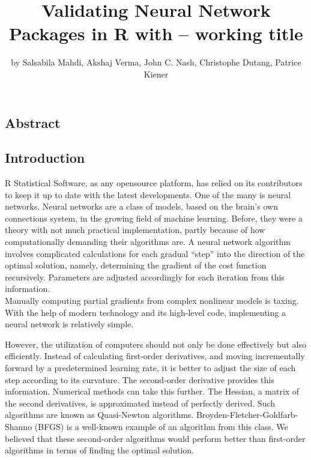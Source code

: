 \title{Validating Neural Network Packages in R with  --
working title}
\author{by Salsabila Mahdi, Akshaj Verma, John C. Nash, Christophe
Dutang, Patrice Kiener}

\maketitle


\hypertarget{abstract}{%
\subsection{Abstract}\label{abstract}}

\hypertarget{introduction}{%
\subsection{Introduction}\label{introduction}}

R Statistical Software, as any opensource platform, has relied on its
contributors to keep it up to date with the latest developments. One of
the many is neural networks. Neural networks are a class of models,
based on the brain's own connections system, in the growing field of
machine learning. Before, they were a theory with not much practical
implementation, partly because of how computationally demanding their
algorithms are. A neural network algorithm involves complicated
calculations for each gradual ``step'' into the direction of the optimal
solution, namely, determining the gradient of the cost function
recursively. Parameters are adjusted accordingly for each iteration from
this information.\\
Manually computing partial gradients from complex nonlinear models is
taxing. With the help of modern technology and its high-level code,
implementing a neural network is relatively simple.

However, the utilization of computers should not only be done
effectively but also efficiently. Instead of calculating first-order
derivatives, and moving incrementally forward by a predetermined
learning rate, it is better to adjust the size of each step according to
its curvature. The second-order derivative provides this information.
Numerical methods can take this further. The Hessian, a matrix of the
second derivatives, is approximated instead of perfectly derived. Such
algorithms are known as Quasi-Newton algorithms.
Broyden-Fletcher-Goldfarb-Shanno (BFGS) is a well-known example of an
algorithm from this class. We believed that these second-order
algorithms would perform better than first-order algorithms in terms of
finding the optimal solution.

